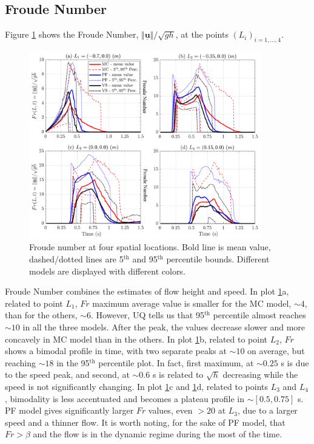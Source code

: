\documentclass{article}
\begin{document}
\subsection{Froude Number}
Figure \ref{fig:Ramp-Fr} shows the Froude Number, $\Vert \underline{\mathbf{u}} \Vert/\sqrt{gh}$, at the points $(L_i)_{i=1,\dots,4}$.
\begin{figure}[H]
         \centering
        \includegraphics[width=0.9\textwidth]{ancFigs/incline/Froude_inc.png}
        \caption{Froude number at four spatial locations. Bold line is mean value, dashed/dotted lines are 5$^{\mathrm{th}}$ and 95$^{\mathrm{th}}$ percentile bounds. Different models are displayed with different colors.}
        \label{fig:Ramp-Fr}
\end{figure}
Froude Number combines the estimates of flow height and speed. In plot \ref{fig:Ramp-Fr}a, related to point $L_1$, $Fr$ maximum average value is smaller for the MC model, $\sim 4$, than for the others, $\sim 6$. However, UQ tells us that 95$^{\mathrm{th}}$ percentile almost reaches $\sim 10$ in all the three models. After the peak, the values decrease slower and more concavely in MC model than in the others. In plot \ref{fig:Ramp-Fr}b, related to point $L_2$, $Fr$ shows a bimodal profile in time, with two separate peaks at $\sim 10$ on average, but reaching $\sim 18$ in the 95$^{\mathrm{th}}$ percentile plot. In fact, first maximum, at $\sim 0.25$ s is due to the speed peak, and second, at $\sim 0.6$ s is related to $\sqrt{h}$ decreasing while the speed is not significantly changing. In plot \ref{fig:Ramp-Fr}c and \ref{fig:Ramp-Fr}d, related to points $L_3$ and $L_4$, bimodality is less accentuated and becomes a plateau profile in $\sim [0.5, 0.75]$ s. PF model gives significantly larger $Fr$ values, even $>20$ at $L_3$, due to a larger speed and a thinner flow. It is worth noting, for the sake of PF model, that $Fr>\beta$ and the flow is in the dynamic regime during the most of the time.
\end{document}
